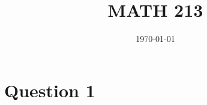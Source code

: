 \documentclass[11pt]{article}
\title{MATH 213}
\date{\today}
\begin{document}
\maketitle

\section{Question 1}
\end{document}
